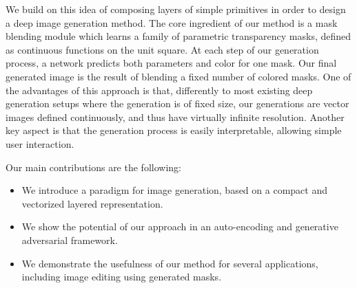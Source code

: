 \documentclass[10pt,twocolumn,letterpaper]{article}
\begin{document}

We build on this idea of composing layers of simple primitives in order to design a deep image generation method. The core ingredient of our method is a mask blending module which learns a family of parametric transparency masks, defined as continuous functions on the unit square. %
At each step of our generation process, a network predicts both parameters and color for one mask. Our final generated image is the result of blending a fixed number of colored masks. One of the advantages of this approach is that, differently to most existing deep generation setups where the generation is of fixed size, our generations are vector images defined continuously, and thus have virtually infinite resolution. Another key aspect is that the generation process is easily interpretable, allowing simple user interaction. %


Our main contributions are the following:
\begin{itemize}
    \item We introduce a paradigm for image generation, based on a compact and vectorized layered representation.
    \item We show the potential of our approach in an auto-encoding and generative adversarial framework.%
    \item We demonstrate the usefulness of our method for several applications, including image editing using generated masks.%
\end{itemize}
    
\end{document}
